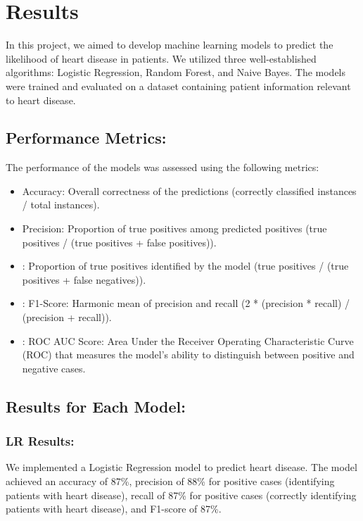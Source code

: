 \chapter{Results}
In this project, we aimed to develop machine learning models to predict the likelihood of heart disease in patients. We utilized three well-established algorithms: Logistic Regression, Random Forest, and Naive Bayes. The models were trained and evaluated on a dataset containing patient information relevant to heart disease.

\section{Performance Metrics:}
The performance of the models was assessed using the following metrics:

\begin{itemize}
    \item Accuracy: Overall correctness of the predictions (correctly classified instances / total instances).
    
    \item Precision: Proportion of true positives among predicted positives (true positives / (true positives + false positives)).
    
    \item: Proportion of true positives identified by the model (true positives / (true positives + false negatives)).

    \item: F1-Score: Harmonic mean of precision and recall (2 * (precision * recall) / (precision + recall)).

    \item: ROC AUC Score: Area Under the Receiver Operating Characteristic Curve (ROC) that measures the model's ability to distinguish between positive and negative cases.
    
\end{itemize}


\clearpage
\section{Results for Each Model:}
\subsection{LR Results:}
We implemented a Logistic Regression model to predict heart disease. The model achieved an accuracy of 87\%, precision of 88\% for positive cases (identifying patients with heart disease), recall of 87\% for positive cases (correctly identifying patients with heart disease), and F1-score of 87\%.


